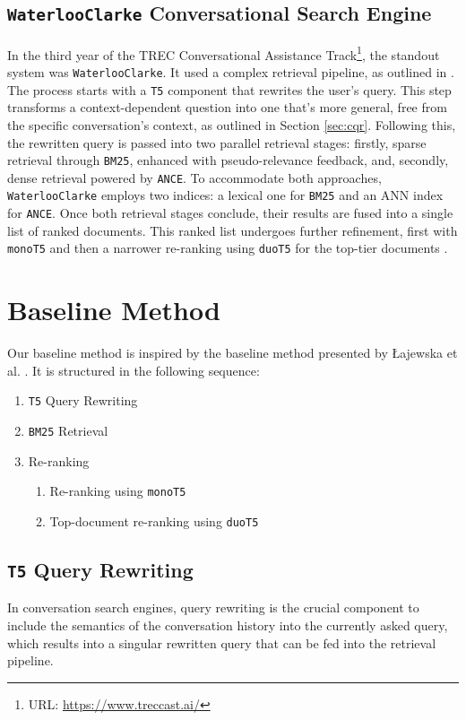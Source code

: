 \documentclass[sigconf]{acmart}
\begin{document}
\subsection{\texttt{WaterlooClarke} Conversational Search Engine}\label{sec:waterlooclarke}
In the third year of the TREC Conversational Assistance Track\footnote{URL: \url{https://www.treccast.ai/}}, the standout system was \texttt{WaterlooClarke}. It used a complex retrieval pipeline, as outlined in \cite{Lajewska:2023:ECIR,yan2021waterlooclarke}. The process starts with a \texttt{T5} component that rewrites the user's query. This step transforms a context-dependent question into one that's more general, free from the specific conversation's context, as outlined in Section \ref{sec:cqr}. Following this, the rewritten query is passed into two parallel retrieval stages: firstly, sparse retrieval through \texttt{BM25}, enhanced with pseudo-relevance feedback, and, secondly, dense retrieval powered by \texttt{ANCE}. To accommodate both approaches, \texttt{WaterlooClarke} employs two indices: a lexical one for \texttt{BM25} and an ANN index for \texttt{ANCE}. Once both retrieval stages conclude, their results are fused into a single list of ranked documents. This ranked list undergoes further refinement, first with \texttt{monoT5} and then a narrower re-ranking using \texttt{duoT5} for the top-tier documents \cite{Lajewska:2023:ECIR,yan2021waterlooclarke}.



\section{Baseline Method}\label{sec:baseline}
Our baseline method is inspired by the baseline method presented by Łajewska et al. \cite{Lajewska:2023:ECIR}. It is structured in the following sequence:
\begin{enumerate}
	\item	\texttt{T5} Query Rewriting
	\item	\texttt{BM25} Retrieval
	\item	Re-ranking
			\begin{enumerate}
				\item	Re-ranking using \texttt{monoT5}
				\item	Top-document re-ranking using \texttt{duoT5}
			\end{enumerate}
\end{enumerate}

\subsection{\texttt{T5} Query Rewriting}
In conversation search engines, query rewriting is the crucial component to include the semantics of the conversation history into the currently asked query, which results into a singular rewritten query that can be fed into the retrieval pipeline.
\end{document}
